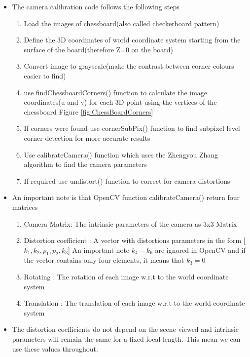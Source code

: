 \begin{itemize}
                         
                \item    The camera calibration code follows the following steps
                         \begin{enumerate}
                             \item Load the images of chessboard(also called checkerboard pattern)
                             \item Define the 3D coordinates of world coordinate system starting from the surface of the board(therefore Z=0 on the board)
                             \item Convert image to grayscale(make the contrast between corner colours easier to find)
                             \item use findChessboardCorners() function to calculate the image coordinates(u and v) for each 3D point using the vertices of the chessboard Figure \ref{fig:ChessBoardCorners}
                             \item If corners were found use cornerSubPix() function to find subpixel level corner detection for more accurate results
                             \item Use calibrateCamera() function which uses the Zhengyou Zhang algorithm to find the camera parameters
                             \item If required use undistort() function to correct for camera distortions
                         \end{enumerate}
                         
                         
                \item     An important note is that OpenCV function calibrateCamera() return four matrices
                            \begin{enumerate}
                                \item Camera Matrix: The intrinsic parameters of the camera as 3x3 Matrix
                                \item Distortion coefficient  : A vector with distortions parameters in the form [$k_1, k_2, p_1, p_2, k_3$]
                                      An important note  $k_4-k_6$ are ignored in OpenCV and if the vector contains only four elements, it means that $k_3=0$ 
                                      
                                \item Rotating : The rotation of each image w.r.t to the world coordinate system
                                \item Translation : The translation of each image w.r.t to the world coordinate system
                            \end{enumerate}
                            
                \item    The distortion coefficients do not depend on the scene viewed and intrinsic parameters will remain the same for a fixed focal length. This mean we can use these values throughout.
            
        \end{itemize}
   
